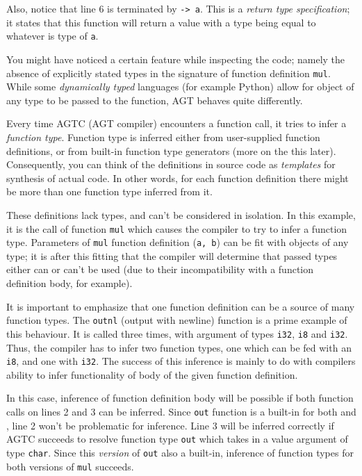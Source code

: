 \documentclass[times, utf8, diplomski]{fer}
\theoremstyle{definition}
\begin{document}
Also, notice that line 6 is terminated by \texttt{-> a}. This is a \textit{return type specification};
it states that this function will return a value with a type being equal to whatever is type of \texttt{a}. 

You might have noticed a certain feature while inspecting the code; 
namely the absence of explicitly stated types in the signature of function definition \texttt{mul}.
While some \textit{dynamically typed} languages (for example Python) allow for object of any type to be passed
to the function, AGT behaves quite differently. 

Every time AGTC (AGT compiler) encounters a function call,
it tries to infer a \textit{function type}. Function type is inferred either from user-supplied function 
definitions, or from built-in function type generators (more on the this later).
Consequently, you can think of the definitions in source code as \textit{templates} for synthesis
of actual code. In other words, for each function definition there might be more than one
function type inferred from it.

These definitions lack types, and can't be considered in isolation.
In this example, it is the call of function \texttt{mul} which causes
the compiler to try to infer a function type.
Parameters of \texttt{mul} function definition (\texttt{a, b}) can be fit with objects of
any type; it is after this fitting that the compiler will determine that passed types either can or can't
be used (due to their incompatibility with a function definition body, for example).

It is important to emphasize that one function definition can be a source of many function types.
The \texttt{outnl} (output with newline) function is a prime example of this behaviour.
It is called three times, with argument of types \texttt{i32}, \texttt{i8} and \texttt{i32}.
Thus, the compiler has to infer two function types, 
one which can be fed with an \texttt{i8}, and one with \texttt{i32}.
The success of this inference is mainly to do with compilers ability to infer functionality of 
body of the given function definition.

In this case, inference of function definition body will be possible if both function calls on lines
2 and 3 can be inferred. Since \texttt{out} function is a built-in for both  and ,
line 2 won't be problematic for inference. Line 3 will be inferred correctly if AGTC succeeds to resolve
function type \texttt{out} which takes in a value argument of type \texttt{char}. 
Since this \textit{version} of \texttt{out} also a built-in,
inference of function types for both versions of \texttt{mul} succeeds.
\end{document}
